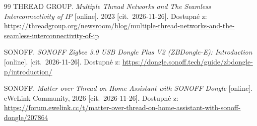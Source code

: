 \begin{thebibliography}{99}
THREAD GROUP. \emph{Multiple Thread Networks and The Seamless Interconnectivity of IP}
[online]. 2023 [cit.~2026-11-26].
Dostupné z: \url{https://threadgroup.org/newsroom/blog/multiple-thread-networks-and-the-seamless-interconnectivity-of-ip}

SONOFF. \emph{SONOFF Zigbee 3.0 USB Dongle Plus V2 (ZBDongle-E): Introduction}
[online]. [cit.~2026-11-26].
Dostupné z: \url{https://dongle.sonoff.tech/guide/zbdongle-p/introduction/}

SONOFF. \emph{Matter over Thread on Home Assistant with SONOFF Dongle}
[online]. eWeLink Community, 2026 [cit.~2026-11-26].
Dostupné z: \url{https://forum.ewelink.cc/t/matter-over-thread-on-home-assistant-with-sonoff-dongle/207864}

\end{thebibliography}


%
%


